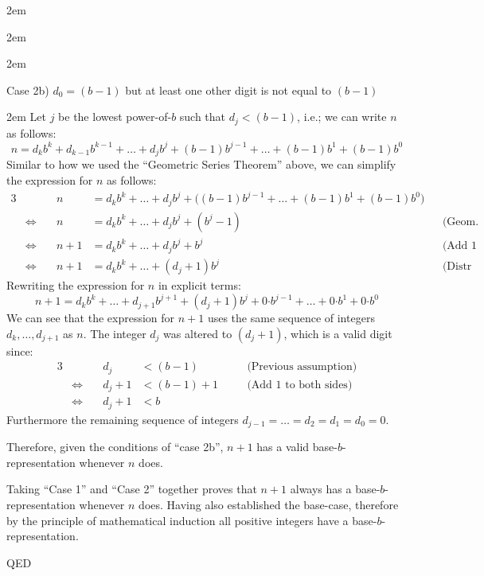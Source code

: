 \documentclass{article}
\newenvironment{jprIn}{\begin{adjustwidth}{2em}{}}{\end{adjustwidth}}
\begin{document}
\begin{jprIn}
\begin{jprIn}
\begin{jprIn}
\end{jprIn}
Case 2b) $d_0=(b-1)$ but at least one other digit is not equal to $(b-1)$
\begin{jprIn}
Let $j$ be the lowest power-of-$b$ such that $d_j<(b{-}1)$,
i.e.; we can write $n$ as follows:
\[n = d_kb^k+d_{k-1}b^{k-1}+\dots+d_jb^j+(b{-}1)b^{j-1}+\dots+(b{-}1)b^1+(b{-}1)b^0\]
Similar to how we used the ``Geometric Series Theorem'' above,
we can simplify the expression for $n$ as follows:
{\small
\begin{alignat*}{3}
  &&n
  &= d_kb^k+\dots+d_jb^j+\big((b{-}1)b^{j-1}+\dots+(b{-}1)b^1+(b{-}1)b^0\big)&&\\
  &\Leftrightarrow\quad
  &n
  &= d_kb^k+\dots+d_jb^j+(b^j-1) &&\text{(Geom. Series Thm.)}\\
  &\Leftrightarrow\quad
  &n+1
  &=  d_kb^k+\dots+d_jb^j+b^j &&\text{(Add 1 to both sides)}\\
  &\Leftrightarrow\quad
  &n+1
  &=  d_kb^k+\dots+(d_j+1)b^j &&\text{(Distr Axiom)}
\end{alignat*}
}Rewriting the expression for $n$ in explicit terms:
\[n+1= d_kb^k+\dots+d_{j+1}b^{j+1}+(d_j+1)b^j+0{\cdot{}}{}b^{j-1}+\dots{}+0{\cdot{}}b^1+0{\cdot{}}b^0\]
We can see that the expression for $n+1$ uses the same
sequence of integers $d_k,\dots{},d_{j+1}$ as $n$.
The integer $d_j$ was altered to $(d_j{+}1)$, which is a valid digit since:
\begin{alignat*}{3}
  &&d_j
  &< (b-1) &&\quad\text{(Previous assumption)}\\
  &\Leftrightarrow\quad
  &d_j+1
  &< (b-1)+1 &&\quad\text{(Add 1 to both sides)}\\  
  &\Leftrightarrow\quad
  &d_j+1
  &< b
\end{alignat*}
Furthermore the remaining sequence of integers $d_{j-1}=\dots{}=d_2=d_1=d_0=0$.

Therefore, given the conditions of ``case 2b'', $n+1$ has
a valid base-$b$-representation whenever $n$ does.
\end{jprIn}
\end{jprIn}
Taking ``Case 1'' and ``Case 2'' together proves that $n+1$
always has a base-$b$-representation whenever $n$ does.
Having also established the base-case, therefore by the principle of mathematical induction
all positive integers have a base-$b$-representation.

\hspace*{\fill}QED
\end{jprIn}
\end{document}
